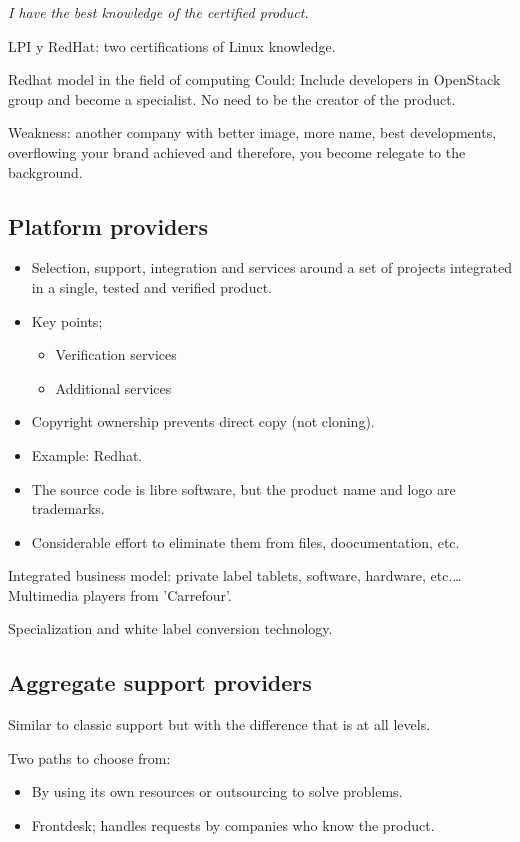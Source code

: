 \emph{I have the best knowledge of the certified product.}

LPI y RedHat: two certifications of Linux knowledge. 

Redhat model in the field of computing Could: Include developers in
OpenStack group and become a specialist. No need to be the creator of the 
product.

Weakness: another company with better image, more name, best developments, 
overflowing your brand achieved and therefore, 
you become relegate to the background.
 
\subsection{Platform providers}

\begin{itemize}
  \item Selection, support, integration and services around a set of projects 
  integrated in a single, tested and verified product.
  \item Key points; 
  \begin{itemize}
    \item Verification services
    \item Additional services    
  \end{itemize}
  \item Copyright ownership prevents direct copy (not cloning).
  \item Example: Redhat.
  \item The source code is libre software, but the product name and logo 
  are trademarks.
  \item Considerable effort to eliminate them from files, doocumentation, etc.
\end{itemize}

Integrated business model: private label tablets, software, hardware, etc.\ldots
Multimedia players from 'Carrefour'.

Specialization and white label conversion technology.

\subsection{Aggregate support providers}

Similar to classic support but with the difference that is at all levels.

Two paths to choose from:
\begin{itemize}
  \item By using its own resources or outsourcing to solve problems.
  \item Frontdesk; handles requests by companies who know the product.
\end{itemize}

